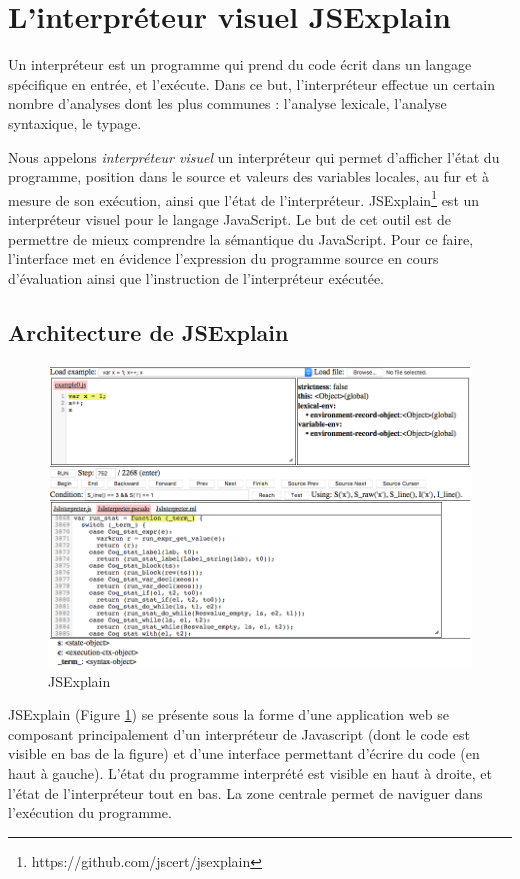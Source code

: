 \documentclass{easychair}
\begin{document}
\section{L'interpréteur visuel JSExplain}

Un interpréteur est un programme qui prend du code écrit dans un langage 
spécifique en entrée, et l'exécute. Dans ce but, l'interpréteur effectue un 
certain nombre d'analyses dont les plus communes : l'analyse lexicale, 
l'analyse syntaxique, le typage.

Nous appelons \emph{interpréteur visuel} un interpréteur qui permet d'afficher
l'état du programme, position dans le source et valeurs des variables locales,
au fur et à mesure de son exécution, ainsi que l'état de l'interpréteur.
JSExplain\footnote{https://github.com/jscert/jsexplain} est un interpréteur
visuel pour le langage JavaScript. Le but de cet outil est de permettre de mieux
comprendre la sémantique du JavaScript. Pour ce faire, l'interface met en
évidence l'expression du programme source en cours d'évaluation ainsi que
l'instruction de l'interpréteur exécutée.

\subsection{Architecture de JSExplain}

\begin{figure}
  \centering
  \includegraphics[width=\textwidth]{jsexplain.png}
  \caption{JSExplain}
  \label{fig:jsexplain}
\end{figure}

JSExplain (Figure \ref{fig:jsexplain}) se présente sous la forme d'une
application web se composant principalement d'un interpréteur de Javascript
(dont le code est visible en bas de la figure) et d'une interface permettant
d'écrire du code (en haut à gauche). L'état du programme interprété est visible
en haut à droite, et l'état de l'interpréteur tout en bas. La zone centrale permet
de naviguer dans l'exécution du programme.
\end{document}
